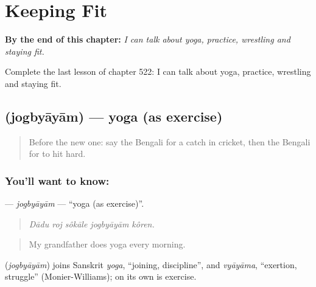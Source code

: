 
\chapter{Keeping Fit}
\label{ch:bn-keeping-fit}

\begin{chapteropening}
\textbf{By the end of this chapter:} \emph{I can talk about yoga, practice, wrestling and staying fit.}

Complete the last lesson of chapter 522: I can talk about yoga, practice, wrestling and staying fit.
\end{chapteropening}

\section[\texorpdfstring{\bn{যোগব্যায়াম} (jogbyāyām)}{যোগব্যায়াম (jogbyāyām)}]{ (jogbyāyām) — yoga (as exercise)}

\label{lesson:BN-C522-jogbyayam}



\begin{quote}
Before the new one: say the Bengali for a catch in cricket, then the Bengali for to hit hard.
\end{quote}

\subsection*{You'll want to know: }
\textbf{} — \emph{jogbyāyām} — \textquotedblleft{}yoga (as exercise)\textquotedblright{}.

\begin{quote}
    
\end{quote}

\begin{quote}
\emph{Dādu roj sôkāle jogbyāyām kôren.}
\end{quote}

\begin{quote}
My grandfather does yoga every morning.
\end{quote}

\begin{cousinweb}
\textbf{} (\emph{jogbyāyām}) joins Sanskrit \emph{yoga}, \textquotedblleft{}joining, discipline\textquotedblright{}, and \emph{vyāyāma}, \textquotedblleft{}exertion, struggle\textquotedblright{} (Monier-Williams);  on its own is exercise.
\end{cousinweb}

